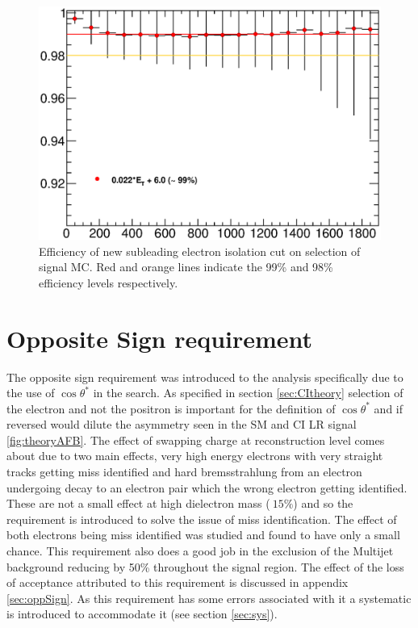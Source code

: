    \begin{figure}[h]
      \begin{center}
      \includegraphics[scale=0.6]{images/C5_sub_iso_efficiency.eps}
      \end{center}
   \caption{Efficiency of new subleading electron isolation cut on selection of signal MC. Red and orange lines indicate the 99\% and 98\% efficiency levels respectively.}
   \label{fig:C5_sub_iso_efficiency}
   \end{figure}



\section{Opposite Sign requirement}

   The opposite sign requirement was introduced to the analysis specifically due to the use of $\cos{\theta^{*}}$ in the search. As specified in section \ref{sec:CItheory} selection of the electron and not the positron is important for the definition of $\cos{\theta^{*}}$ and if reversed would dilute the asymmetry seen in the SM and CI LR signal \ref{fig:theoryAFB}. The effect of swapping charge at reconstruction level comes about due to two main effects, very high energy electrons with very straight tracks getting miss identified and hard bremsstrahlung from an electron undergoing decay to an electron pair which the wrong electron getting identified. These are not a small effect at high dielectron mass ($~ 15\%$) and so the requirement is introduced to solve the issue of miss identification. The effect of both electrons being miss identified was studied and found to have only a small chance. This requirement also does a good job in the exclusion of the Multijet background reducing by 50\% throughout the signal region. The effect of the loss of acceptance attributed to this requirement is discussed in appendix \ref{sec:oppSign}. As this requirement has some errors associated with it a systematic is introduced to accommodate it (see section \ref{sec:sys}). 


